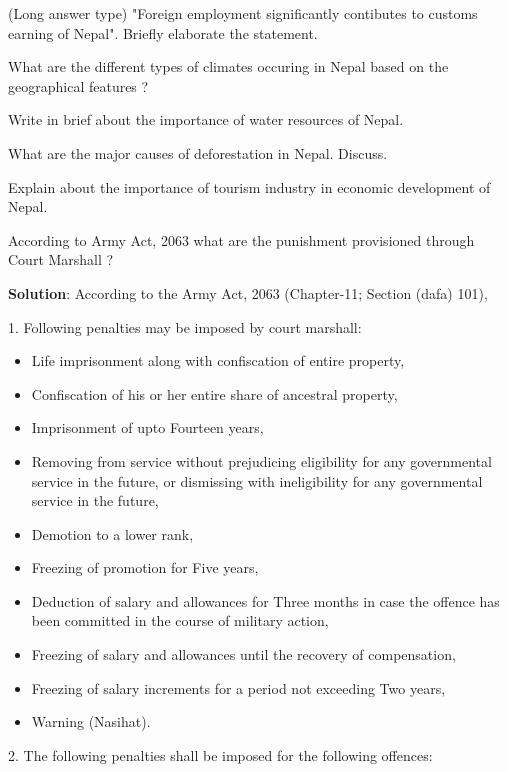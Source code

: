 \documentclass[
]{book}
\newcommand{\question}{\item}
\newenvironment{solution}{ {\bfseries Solution}:}{}
\begin{document}
\begin{questions}
\question (Long answer type) "Foreign employment significantly contibutes to customs earning of Nepal". Briefly elaborate the statement.

\question What are the different types of climates occuring in Nepal based on the geographical features ?

\question Write in brief about the importance of water resources of Nepal.

\question What are the major causes of deforestation in Nepal. Discuss.

\question Explain about the importance of tourism industry in economic development of Nepal.

\question According to Army Act, 2063 what are the punishment provisioned through Court Marshall ?

\begin{solution}
According to the Army Act, 2063 (Chapter-11; Section (dafa) 101), 

1. Following penalties may be imposed by court marshall:

\begin{itemize}
\item Life imprisonment along with confiscation of entire property,
\item Confiscation of his or her entire share of ancestral property,
\item Imprisonment of upto Fourteen years,
\item Removing from service without prejudicing eligibility for any governmental service in the future, or dismissing with ineligibility for any governmental service in the future,
\item Demotion to a lower rank,
\item Freezing of promotion for Five years,
\item Deduction of salary and allowances for Three months in case the offence has been committed in the course of military action,
\item Freezing of salary and allowances until the recovery of compensation,
\item Freezing of salary increments for a period not  exceeding Two years,
\item Warning (Nasihat).
\end{itemize}

2. The following penalties shall be imposed for the following offences:


\end{solution}
\end{questions}
\end{document}
